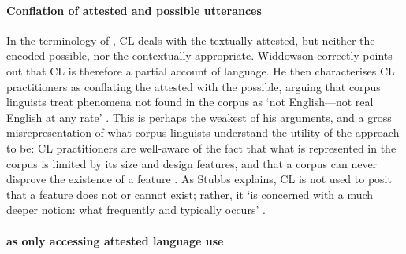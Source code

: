 

\paragraph{Conflation of attested and possible utterances}

In the terminology of \textcite{hymes_communicative_1972}, \gls{CL} deals with the textually attested, but neither the encoded possible, nor the contextually appropriate. Widdowson correctly points out that \gls{CL} is therefore a partial account of language. He then characterises \gls{CL} practitioners as conflating the attested with the possible, arguing that corpus linguists treat phenomena not found in the corpus as `not English---not real English at any rate' \parencite*[p.~14]{widdowson_description_1991}. This is perhaps the weakest of his arguments, and a gross misrepresentation of what corpus linguists understand the utility of the approach to be: \gls{CL} practitioners are well\hyp{}aware of the fact that what is represented in the \gls{corpus} is limited by its size and design features, and that a \gls{corpus} can never disprove the existence of a feature \cite{baker_sociolinguistics_2010}. As Stubbs explains, \gls{CL} is not used to posit that a feature does not or cannot exist; rather, it `is concerned with a much deeper notion: what frequently and typically occurs' \cite[p.~151]{stubbs_texts_2001}.

\paragraph{ as only accessing attested language use}

